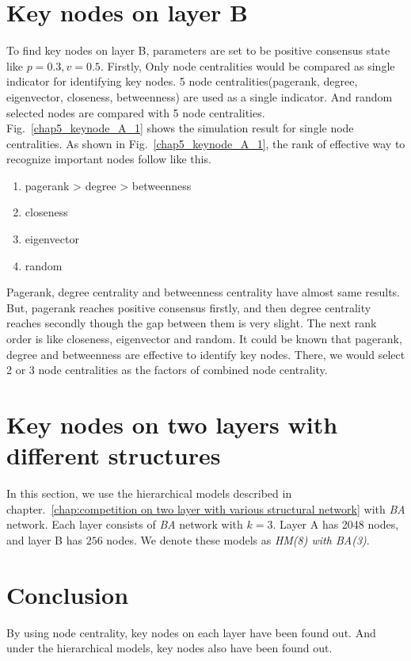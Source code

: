   
  
  
\section{Key nodes on layer B}
To find key nodes on layer B, parameters are set to be positive consensus state like $p=0.3, v=0.5$. Firstly, Only node centralities would be compared as single indicator for identifying key nodes. 5 node centralities(pagerank, degree, eigenvector, closeness, betweenness) are used as a single indicator. And random selected nodes are compared with 5 node centralities. 
Fig.~\ref{chap5_keynode_A_1} shows the simulation result for single node centralities. As shown in Fig.~\ref{chap5_keynode_A_1}, the rank of effective way to recognize important nodes follow like this. 
\begin{enumerate}
	\item pagerank > degree > betweenness  
	\item closeness
	\item eigenvector       
	\item random
\end{enumerate}
Pagerank, degree centrality and betweenness centrality have almost same results. But, pagerank reaches positive consensus firstly, and then degree centrality reaches secondly though the gap between them is very slight. The next rank order is like closeness, eigenvector and random. It could be known that pagerank, degree and betweenness are effective to identify key nodes. There, we would select 2 or 3 node centralities as the factors of combined node centrality. 





\section{Key nodes on two layers with different structures}
In this section, we use the hierarchical models described in chapter.~\ref{chap:competition on two layer with various structural network} with \textit{BA} network. Each layer consists of \textit{BA} network with $k=3$. Layer A has 2048 nodes, and layer B has $256$ nodes. We denote these models as \textit{HM(8) with BA(3)}. 



\section{Conclusion}
By using node centrality, key nodes on each layer have been found out. 
And under the hierarchical models, key nodes also have been found out. 